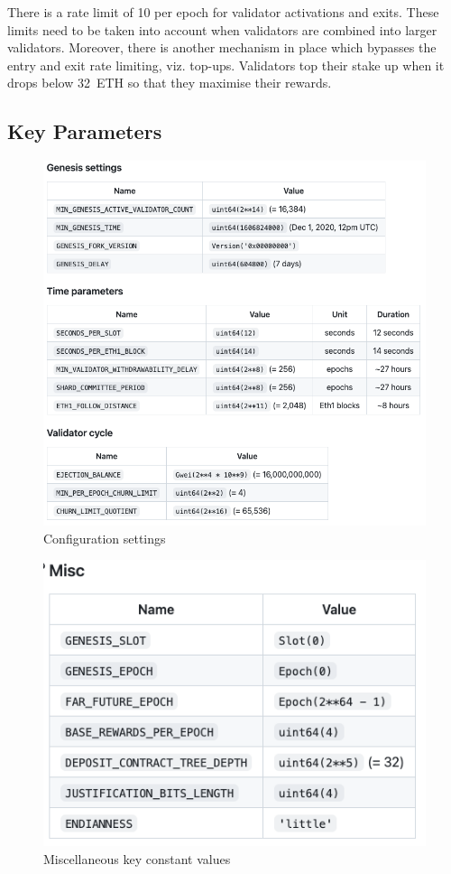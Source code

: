 \documentclass[UTF8]{article}
\begin{document}
{There is a rate limit of 10 per epoch for validator activations and exits. These limits need to be taken into account when validators are combined into larger validators. Moreover, there is another mechanism in place which bypasses the entry and exit rate limiting, viz. top-ups. Validators top their stake up when it drops below 32~ETH so that they maximise their rewards. 
 \subsection{Key Parameters }
\begin{figure}[htbp]
\begin{center}
\includegraphics[width=0.7\linewidth]{images/configvalues}
\caption{Configuration settings}
\label{fig:config}
\end{center}
\end{figure}

\begin{figure}[htbp]
\begin{center}
\includegraphics[width=0.6\linewidth]{images/constants}
\caption{Miscellaneous key constant values}
\label{fig:constants}
\end{center}
\end{figure}

}
\end{document}
